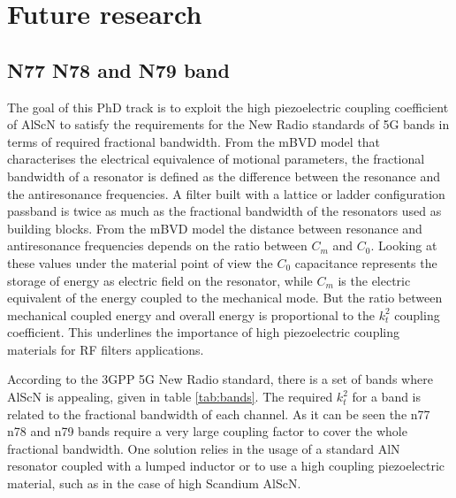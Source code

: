 \chapter{Future research}
\section{N77 N78 and N79 band}
The goal of this PhD track is to exploit the high piezoelectric coupling coefficient of AlScN to satisfy the requirements for the New Radio standards of 5G bands in terms of required fractional bandwidth. From the mBVD model that characterises the electrical equivalence of motional parameters, the fractional bandwidth of a resonator is defined as the difference between the resonance and the antiresonance frequencies. A filter built with a lattice or ladder configuration passband is twice as much as the fractional bandwidth of the resonators used as building blocks. From the mBVD model the distance between resonance and antiresonance frequencies depends on the ratio between $C_m$ and $ C_0 $. Looking at these values under the material point of view the $ C_0 $ capacitance represents the storage of energy as electric field on the resonator, while $ C_m $ is the electric equivalent of the energy coupled to the mechanical mode. But the ratio between mechanical coupled energy and overall energy is proportional to the $ k_t^2 $ coupling coefficient. This underlines the importance of high piezoelectric coupling materials for RF filters applications. 

According to the 3GPP 5G New Radio standard, there is a set of bands where AlScN is appealing, given in table \ref{tab:bands}. The required $ k_t^2 $ for a band is related to the fractional bandwidth of each channel. As it can be seen the n77 n78 and n79 bands require a very large coupling factor to cover the whole fractional bandwidth. One solution relies in the usage of a standard AlN resonator coupled with a lumped inductor \cite{gao_aln_2020} or to use a high coupling piezoelectric material, such as in the case of high Scandium AlScN. 


